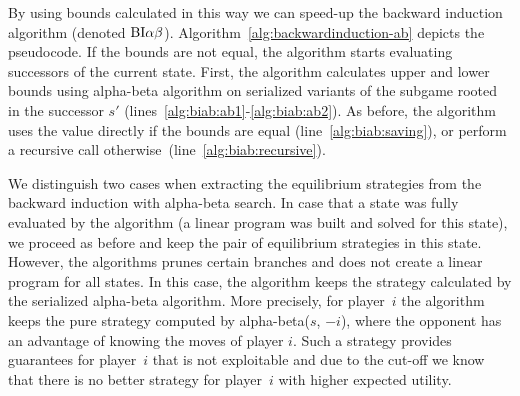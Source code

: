 By using bounds calculated in this way we can speed-up the backward induction algorithm (denoted $\textrm{BI}\alpha\beta$).
Algorithm~\ref{alg:backwardinduction-ab} depicts the pseudocode.
If the bounds are not equal, the algorithm starts evaluating successors of the current state.
First, the algorithm calculates upper and lower bounds using alpha-beta algorithm on serialized variants of the subgame rooted in the successor $s'$ (lines~\ref{alg:biab:ab1}-\ref{alg:biab:ab2}).
As before, the algorithm uses the value directly if the bounds are equal (line~\ref{alg:biab:saving}), or perform a recursive call otherwise~(line~\ref{alg:biab:recursive}).

We distinguish two cases when extracting the equilibrium strategies from the backward induction with alpha-beta search.
In case that a state was fully evaluated by the algorithm (\ie a linear program was built and solved for this state), we proceed as before and keep the pair of equilibrium strategies in this state.
However, the algorithms prunes certain branches and does not create a linear program for all states.
In this case, the algorithm keeps the strategy calculated by the serialized alpha-beta algorithm.
More precisely, for player~$i$ the algorithm keeps the pure strategy computed by alpha-beta($s$, $-i$), where the opponent has an advantage of knowing the moves of player $i$.
Such a strategy provides guarantees for player~$i$ that is not exploitable and due to the cut-off we know that there is no better strategy for player~$i$ with higher expected utility.

